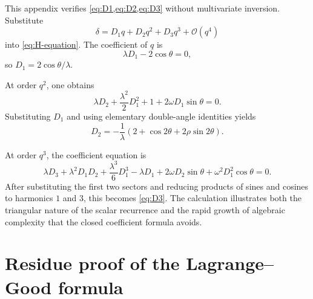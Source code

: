 \documentclass[11pt,oneside]{article}
\numberwithin{equation}{section}
\theoremstyle{plain}
\theoremstyle{definition}
\theoremstyle{remark}
\newcommand{\Ord}{\mathcal O}
\begin{document}
This appendix verifies \cref{eq:D1,eq:D2,eq:D3} without multivariate
inversion.  Substitute
\[
 \delta=D_1q+D_2q^2+D_3q^3+\Ord(q^4)
\]
into \cref{eq:H-equation}.  The coefficient of \(q\) is
\begin{equation}\label{eq:direct-q1}
 \lambda D_1-2\cos\theta=0,
\end{equation}
so \(D_1=2\cos\theta/\lambda\).

At order \(q^2\), one obtains
\begin{equation}\label{eq:direct-q2}
 \lambda D_2+\frac{\lambda^2}{2}D_1^2+1
 +2\omega D_1\sin\theta=0.
\end{equation}
Substituting \(D_1\) and using elementary double-angle identities yields
\[
 D_2=-\frac1\lambda
 \left(2+\cos2\theta+2\rho\sin2\theta\right).
\]

At order \(q^3\), the coefficient equation is
\begin{equation}\label{eq:direct-q3}
 \lambda D_3
 +\lambda^2D_1D_2
 +\frac{\lambda^3}{6}D_1^3
 -\lambda D_1
 +2\omega D_2\sin\theta
 +\omega^2D_1^2\cos\theta=0.
\end{equation}
After substituting the first two sectors and reducing products of sines and
cosines to harmonics \(1\) and \(3\), this becomes \cref{eq:D3}.  The
calculation illustrates both the triangular nature of the scalar recurrence
and the rapid growth of algebraic complexity that the closed coefficient
formula avoids.

\section{Residue proof of the Lagrange--Good formula}\label{app:good-proof}
\end{document}
